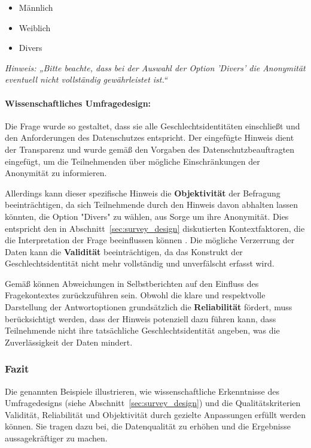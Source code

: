 \documentclass[german,report]{i1thesis}
\begin{document}
\begin{itemize}
    \item Männlich
    \item Weiblich
    \item Divers
\end{itemize}

\textit{Hinweis: „Bitte beachte, dass bei der Auswahl der Option 'Divers' die Anonymität eventuell nicht vollständig gewährleistet ist.“}

\paragraph{Wissenschaftliches Umfragedesign:}

Die Frage wurde so gestaltet, dass sie alle Geschlechtsidentitäten einschließt und den Anforderungen des Datenschutzes entspricht. Der eingefügte Hinweis dient der Transparenz und wurde gemäß den Vorgaben des Datenschutzbeauftragten eingefügt, um die Teilnehmenden über mögliche Einschränkungen der Anonymität zu informieren.

Allerdings kann dieser spezifische Hinweis die \textbf{Objektivität} der Befragung beeinträchtigen, da sich Teilnehmende durch den Hinweis davon abhalten lassen könnten, die Option "Divers" zu wählen, aus Sorge um ihre Anonymität. Dies entspricht den in Abschnitt~\ref{sec:survey_design} diskutierten Kontextfaktoren, die die Interpretation der Frage beeinflussen können \cite{Schwarz1999}. Die mögliche Verzerrung der Daten kann die \textbf{Validität} beeinträchtigen, da das Konstrukt der Geschlechtsidentität nicht mehr vollständig und unverfälscht erfasst wird.

Gemäß \citet{LucasBaird2006} können Abweichungen in Selbstberichten auf den Einfluss des Fragekontextes zurückzuführen sein. Obwohl die klare und respektvolle Darstellung der Antwortoptionen grundsätzlich die \textbf{Reliabilität} fördert, muss berücksichtigt werden, dass der Hinweis potenziell dazu führen kann, dass Teilnehmende nicht ihre tatsächliche Geschlechtsidentität angeben, was die Zuverlässigkeit der Daten mindert.

\subsubsection{Fazit}

Die genannten Beispiele illustrieren, wie wissenschaftliche Erkenntnisse des Umfragedesigns (siehe Abschnitt~\ref{sec:survey_design}) und die Qualitätskriterien Validität, Reliabilität und Objektivität durch gezielte Anpassungen erfüllt werden können. Sie tragen dazu bei, die Datenqualität zu erhöhen und die Ergebnisse aussagekräftiger zu machen.
\end{document}

